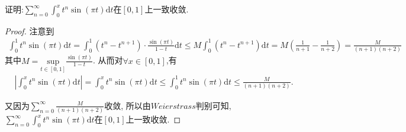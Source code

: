 \documentclass[../../main.tex]{subfiles}%
\begin{document}
\begin{example}
证明:$\sum_{n=0}^{\infty}{\int_0^x{t^n\sin \left( \pi t \right) \mathrm{d}t}}$在$\left[ 0,1 \right] $上一致收敛.
\end{example}
\begin{proof}
注意到\begin{align*}
\int_0^1{t^n\sin \left( \pi t \right) \mathrm{d}t}=\int_0^1{ \left( t^n-t^{n+1} \right) \cdot \frac{\sin \left( \pi t \right)}{1-t}  \mathrm{d}t}\leqslant M\int_0^1{\left( t^n-t^{n+1} \right)}\mathrm{d}t=M\left( \frac{1}{n+1}-\frac{1}{n+2} \right) =\frac{M}{\left( n+1 \right) \left( n+2 \right)}
\end{align*}
其中$M=\underset{t\in \left[ 0,1 \right]}{\mathrm{sup}}\frac{\sin \left( \pi t \right)}{1-t}$.
从而对$\forall x\in[0,1]$,有\begin{align*}
\left| \int_0^x{t^n\sin \left( \pi t \right) \mathrm{d}t} \right|=\int_0^x{t^n\sin \left( \pi t \right) \mathrm{d}t}\leqslant \int_0^1{t^n\sin \left( \pi t \right) \mathrm{d}t}\leqslant \frac{M}{\left( n+1 \right) \left( n+2 \right)}.
\end{align*}



又因为$\sum_{n=0}^{\infty}{\frac{M}{\left( n+1 \right) \left( n+2 \right)}}$收敛,
所以由$Weierstrass$判别可知,$\sum_{n=0}^{\infty}{\int_0^x{t^n\sin \left( \pi t \right) \mathrm{d}t}}$在$\left[ 0,1 \right] $上一致收敛.
\end{proof}
\end{document}
